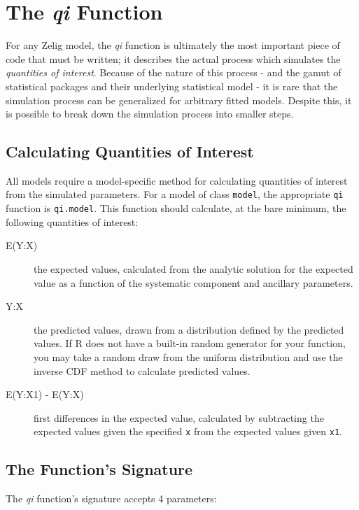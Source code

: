 \documentclass[11pt]{article}
\begin{document}
\section{The \emph{qi} Function}
For any Zelig model, the \emph{qi} function is ultimately the most important piece of code that must be written; it describes the actual process which simulates the \emph{quantities of interest}.  Because of the nature of this process - and the gamut of statistical packages and their underlying statistical model - it is rare that the simulation process can be generalized for arbitrary fitted models.  Despite this, it is possible to break down the simulation process into smaller steps.

\subsection{Calculating Quantities of Interest}
All models require a model-specific method for calculating quantities of interest from the simulated parameters. For a model of class {\tt model}, the appropriate {\tt qi} function is {\tt qi.model}. This function should calculate, at the bare minimum, the following quantities of interest:

\begin{description}
	\item[E(Y:X)]{the expected values, calculated from the analytic solution for the expected value as a function of the systematic component and ancillary parameters.}
	\item[Y:X]{the predicted values, drawn from a distribution defined by the predicted values. If R does not have a built-in random generator for your function, you may take a random draw from the uniform distribution and use the inverse CDF method to calculate predicted values.}
	\item[E(Y:X1) - E(Y:X)]{first differences in the expected value, calculated by subtracting the expected values given the specified {\tt x} from the expected values given {\tt x1}.}
\end{description}


\subsection{The Function's Signature}
The \emph{qi} function's signature accepts 4 parameters:
\end{document}
